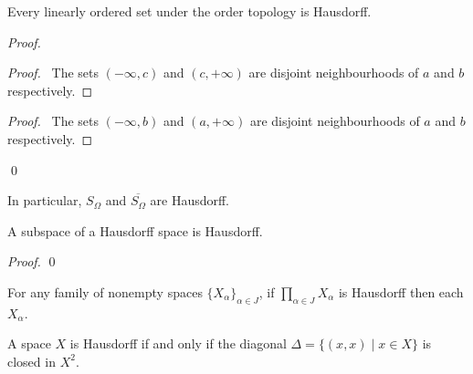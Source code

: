 \begin{theorem}
    Every linearly ordered set under the order topology is Hausdorff.
\end{theorem}

\begin{proof}
    \pf
    \begin{proof}
        \pf\ The sets $(-\infty,c)$ and $(c,+\infty)$ are disjoint neighbourhoods of $a$ and $b$
        respectively.
    \end{proof}
    \begin{proof}
        \pf\ The sets $(-\infty, b)$ and $(a,+\infty)$ are disjoint neighbourhoods of $a$ and $b$
        respectively.
    \end{proof}
    \qed
\end{proof}

\begin{example}
    In particular, $S_\Omega$ and $\overline{S_\Omega}$ are Hausdorff.
\end{example}

\begin{theorem}
    \label{theorem:subspace_Haudorff}
    A subspace of a Hausdorff space is Hausdorff.
\end{theorem}

\begin{proof}
    \pf
    \qed
\end{proof}

\begin{corollary}
    For any family of nonempty spaces $\{ X_\alpha \}_{\alpha \in J}$, if
    $\prod_{\alpha \in J} X_\alpha$ is Hausdorff then each $X_\alpha$.
\end{corollary}

\begin{proposition}
    A space $X$ is Hausdorff if and only if the diagonal $\Delta = \{ (x,x) \mid x \in X \}$ is closed in $X^2$.
\end{proposition}

